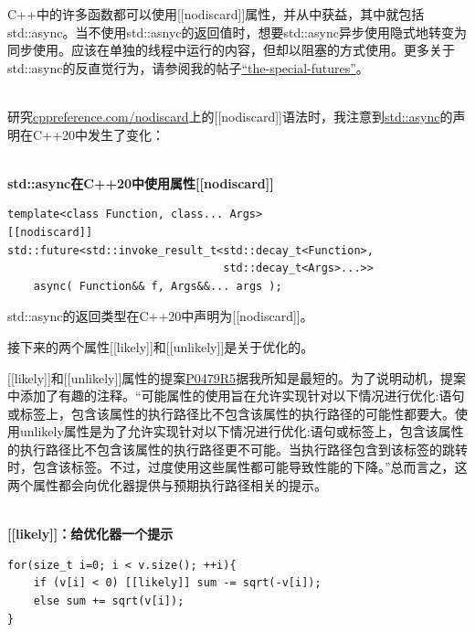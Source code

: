 \begin{tcolorbox}[breakable,enhanced jigsaw,colback=red!5!white,colframe=red!75!black,title={std::async的问题}]
	
C++中的许多函数都可以使用[[nodiscard]]属性，并从中获益，其中就包括std::async。当不使用std::asnyc的返回值时，想要std::async异步使用隐式地转变为同步使用。应该在单独的线程中运行的内容，但却以阻塞的方式使用。更多关于std::async的反直觉行为，请参阅我的帖子\href{https://www.modernescpp.com/index.php/the-special-futures}{“the-special-futures”}。

\hspace*{\fill} \\ %
研究\href{https://en.cppreference.com/w/cpp/language/attributes/nodiscard}{cppreference.com/nodiscard}上的[[nodiscard]]语法时，我注意到\href{https://en.cppreference.com/w/cpp/thread/async}{std::async}的声明在C++20中发生了变化：

\hspace*{\fill} \\ %
\noindent
\textbf{std::async在C++20中使用属性[[nodiscard]]}
\begin{lstlisting}[style=styleCXX]
template<class Function, class... Args>
[[nodiscard]]
std::future<std::invoke_result_t<std::decay_t<Function>,
								 std::decay_t<Args>...>>
	async( Function&& f, Args&&... args );
\end{lstlisting}

std::async的返回类型在C++20中声明为[[nodiscard]]。
	
\end{tcolorbox}

接下来的两个属性[[likely]]和[[unlikely]]是关于优化的。


[[likely]]和[[unlikely]]属性的提案\href{http://www.open-std.org/jtc1/sc22/wg21/docs/papers/2018/p0479r5.html}{P0479R5}据我所知是最短的。为了说明动机，提案中添加了有趣的注释。“可能属性的使用旨在允许实现针对以下情况进行优化:语句或标签上，包含该属性的执行路径比不包含该属性的执行路径的可能性都要大。使用unlikely属性是为了允许实现针对以下情况进行优化:语句或标签上，包含该属性的执行路径比不包含该属性的执行路径更不可能。当执行路径包含到该标签的跳转时，包含该标签。不过，过度使用这些属性都可能导致性能的下降。”总而言之，这两个属性都会向优化器提供与预期执行路径相关的提示。

\hspace*{\fill} \\ %
\noindent
\textbf{[[likely]]：给优化器一个提示}
\begin{lstlisting}[style=styleCXX]
for(size_t i=0; i < v.size(); ++i){
	if (v[i] < 0) [[likely]] sum -= sqrt(-v[i]);
	else sum += sqrt(v[i]);
}
\end{lstlisting}

